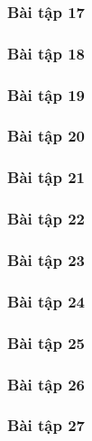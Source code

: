 \documentclass[a4paper]{article}
\begin{document}
\clearpage
\subsubsection{Bài tập 17}

\clearpage
\subsubsection{Bài tập 18}

\clearpage
\subsubsection{Bài tập 19}

\clearpage
\subsubsection{Bài tập 20}

\clearpage
\subsubsection{Bài tập 21}

\clearpage
\subsubsection{Bài tập 22}

\clearpage
\subsubsection{Bài tập 23}

\clearpage
\subsubsection{Bài tập 24}

\clearpage
\subsubsection{Bài tập 25}

\clearpage
\subsubsection{Bài tập 26}

\clearpage
\subsubsection{Bài tập 27}
\end{document}
